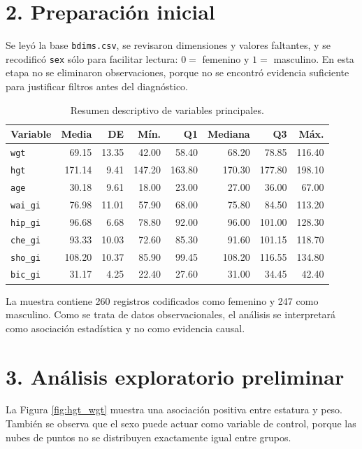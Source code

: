 \documentclass[10pt,letterpaper]{article}
\begin{document}
\section*{2. Preparación inicial}

Se leyó la base \texttt{bdims.csv}, se revisaron dimensiones y valores faltantes, y se recodificó \texttt{sex} sólo para facilitar lectura: $0=$ femenino y $1=$ masculino. En esta etapa no se eliminaron observaciones, porque no se encontró evidencia suficiente para justificar filtros antes del diagnóstico.

\begin{table}[H]
\centering
\caption{Resumen descriptivo de variables principales.}
\small
\begin{tabular}{lrrrrrrr}
\toprule
Variable & Media & DE & Mín. & Q1 & Mediana & Q3 & Máx. \\
\midrule
\texttt{wgt} & 69.15 & 13.35 & 42.00 & 58.40 & 68.20 & 78.85 & 116.40 \\
\texttt{hgt} & 171.14 & 9.41 & 147.20 & 163.80 & 170.30 & 177.80 & 198.10 \\
\texttt{age} & 30.18 & 9.61 & 18.00 & 23.00 & 27.00 & 36.00 & 67.00 \\
\texttt{wai\_gi} & 76.98 & 11.01 & 57.90 & 68.00 & 75.80 & 84.50 & 113.20 \\
\texttt{hip\_gi} & 96.68 & 6.68 & 78.80 & 92.00 & 96.00 & 101.00 & 128.30 \\
\texttt{che\_gi} & 93.33 & 10.03 & 72.60 & 85.30 & 91.60 & 101.15 & 118.70 \\
\texttt{sho\_gi} & 108.20 & 10.37 & 85.90 & 99.45 & 108.20 & 116.55 & 134.80 \\
\texttt{bic\_gi} & 31.17 & 4.25 & 22.40 & 27.60 & 31.00 & 34.45 & 42.40 \\
\bottomrule
\end{tabular}
\end{table}

La muestra contiene 260 registros codificados como femenino y 247 como masculino. Como se trata de datos observacionales, el análisis se interpretará como asociación estadística y no como evidencia causal.

\section*{3. Análisis exploratorio preliminar}

La Figura \ref{fig:hgt_wgt} muestra una asociación positiva entre estatura y peso. También se observa que el sexo puede actuar como variable de control, porque las nubes de puntos no se distribuyen exactamente igual entre grupos.
\end{document}
